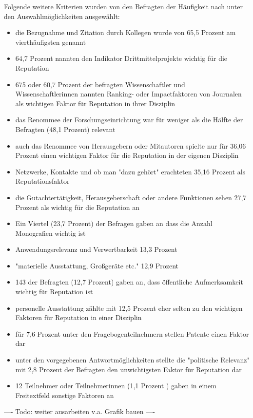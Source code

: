 Folgende weitere Kriterien wurden von den Befragten der Häufigkeit nach unter den Auswahlmöglichkeiten ausgewählt:
\begin{itemize}
\item die Bezugnahme und Zitation durch Kollegen wurde von 65,5 Prozent am vierthäufigsten genannt
\item 64,7 Prozent nannten den Indikator Drittmittelprojekte wichtig für die Reputation
\item 675 oder 60,7 Prozent der befragten Wissenschaftler und Wissenschaftlerinnen nannten Ranking- oder Impactfaktoren von Journalen als wichtigen Faktor für Reputation in ihrer Disziplin
\item das Renommee der Forschungseinrichtung war für weniger als die Hälfte der Befragten (48,1 Prozent) relevant
\item auch das Renommee von Herausgebern oder Mitautoren spielte nur für 36,06 Prozent einen wichtigen Faktor für die Reputation in der eigenen Disziplin
\item Netzwerke, Kontakte und ob man "dazu gehört" erachteten 35,16 Prozent als Reputationsfaktor
\item die Gutachtertätigkeit, Herausgeberschaft oder andere Funktionen sehen 27,7 Prozent als wichtig für die Reputation an
\item Ein Viertel (23,7 Prozent) der Befragen gaben an dass die Anzahl Monografien wichtig ist
\item Anwendungsrelevanz und Verwertbarkeit 13,3 Prozent
\item "materielle Ausstattung, Großgeräte etc." 12,9 Prozent
\item 143 der Befragten (12,7 Prozent) gaben an, dass öffentliche Aufmerksamkeit wichtig für Reputation ist
\item personelle Ausstattung zählte mit 12,5 Prozent eher selten zu den wichtigen Faktoren für Reputation in einer Disziplin
\item für 7,6 Prozent unter den Fragebogenteilnehmern stellen Patente einen Faktor dar
\item unter den vorgegebenen Antwortmöglichkeiten stellte die "politische Relevanz" mit 2,8 Prozent der Befragten den unwichtigsten Faktor für Reputation dar
\item 12 Teilnehmer oder Teilnehmerinnen (1,1 Prozent ) gaben in einem Freitextfeld sonstige Faktoren an
\end{itemize}

---- Todo: weiter ausarbeiten v.a. Grafik bauen ----

